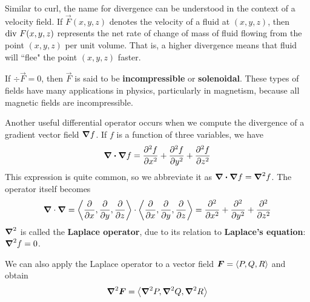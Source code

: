 Similar to curl, the name for divergence can be understood in the context of a velocity field. If $\vec F(x,y,z)$ denotes the velocity of a fluid at $(x,y,z)$, then $\operatorname{div}\, F(x,y,z)$ represents the net rate of change of mass of fluid flowing from the point $(x,y,z)$ per unit volume. That is, a higher divergence means that fluid will ``flee" the point $(x,y,z)$ faster. \par
If $\div\vec F = 0$, then $\vec F$ is said to be \textbf{incompressible} or \textbf{solenoidal}. These types of fields have many applications in physics, particularly in magnetism, because all magnetic fields are incompressible. \par
Another useful differential operator occurs when we compute the divergence of a gradient vector field $\boldsymbol\nabla f$. If $f$ is a function of three variables, we have
\[ \div \boldsymbol\nabla f = \pdv[2]{f}{x} + \pdv[2]{f}{y} + \pdv[2]{f}{z}\]
This expression is quite common, so we abbreviate it as $\div\boldsymbol\nabla f = \boldsymbol\nabla^2f$. The operator itself becomes
\[ \boldsymbol\nabla \cdot \boldsymbol\nabla = \left\langle\pdv{}{x}, \pdv{}{y}, \pdv{}{z}\right\rangle \cdot \left\langle\pdv{}{x}, \pdv{}{y}, \pdv{}{z}\right\rangle = \pdv[2]{x} + \pdv[2]{y} + \pdv[2]{z}\]$\boldsymbol\nabla^2$ is called the \textbf{Laplace operator}, due to its relation to \textbf{Laplace's equation}: $\boldsymbol\nabla^2f = 0$. \par
We can also apply the Laplace operator to a vector field $\boldsymbol{F} = \left\langle P,Q,R\right\rangle$ and obtain
\[ \boldsymbol\nabla^2\boldsymbol{F} = \left\langle \boldsymbol\nabla^2P, \boldsymbol\nabla^2Q, \boldsymbol\nabla^2R\right\rangle\]
